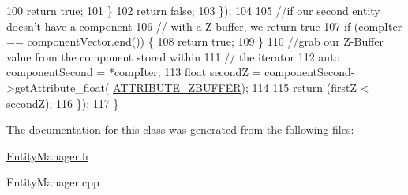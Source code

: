 \begin{DoxyCode}
100                         \textcolor{keywordflow}{return} \textcolor{keyword}{true};
101                     \}
102                     \textcolor{keywordflow}{return} \textcolor{keyword}{false};
103             \});
104 
105             \textcolor{comment}{//if our second entity doesn't have a component}
106             \textcolor{comment}{// with a Z-buffer, we return true}
107             \textcolor{keywordflow}{if} (compIter == componentVector.end()) \{
108                 \textcolor{keywordflow}{return} \textcolor{keyword}{true};
109             \}
110             \textcolor{comment}{//grab our Z-Buffer value from the component stored within}
111             \textcolor{comment}{// the iterator}
112             \textcolor{keyword}{auto} componentSecond = *compIter;
113             \textcolor{keywordtype}{float} secondZ = componentSecond->getAttribute\_float(
      \hyperlink{_a_e___attributes_8h_af11539bb711833d6321aaccd369e9e4b}{ATTRIBUTE\_ZBUFFER});
114 
115             \textcolor{keywordflow}{return} (firstZ < secondZ);
116     \});
117 \}\end{DoxyCode}


The documentation for this class was generated from the following files\-:\begin{DoxyCompactItemize}
\item 
\hyperlink{_entity_manager_8h}{Entity\-Manager.\-h}\item 
Entity\-Manager.\-cpp\end{DoxyCompactItemize}
